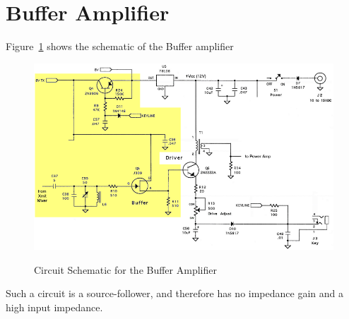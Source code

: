 \section{Buffer Amplifier}

Figure~\ref{BuffAmp} shows the schematic of the Buffer amplifier

\begin{figure}[h!]
  \centering
  \includegraphics[scale=0.5]{./img/BuffAmp.png}
  \label{BuffAmp}
  \caption{Circuit Schematic for the Buffer Amplifier}
\end{figure}

Such a circuit is a source-follower, and therefore has no impedance gain and a
high input impedance.



